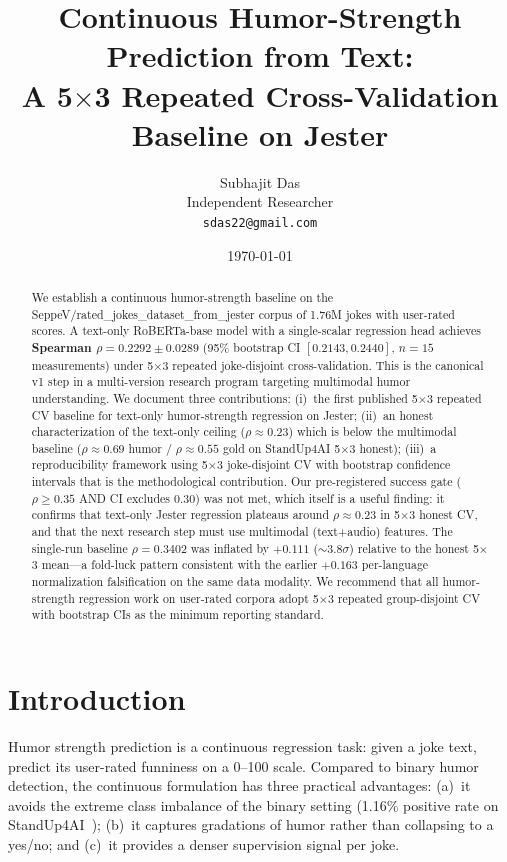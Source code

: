 \documentclass[11pt, letterpaper]{article}
\title{Continuous Humor-Strength Prediction from Text:\\
       A 5$\times$3 Repeated Cross-Validation Baseline on Jester}
\author{Subhajit Das \\
Independent Researcher \\
\texttt{sdas22@gmail.com}}
\date{\today}
\begin{document}
\maketitle

\begin{abstract}
We establish a continuous humor-strength baseline on the SeppeV/rated\_jokes\_dataset\_from\_jester corpus of 1.76M jokes with user-rated scores. A text-only RoBERTa-base model with a single-scalar regression head achieves \textbf{Spearman $\rho = 0.2292 \pm 0.0289$} (95\% bootstrap CI $[0.2143, 0.2440]$, $n=15$ measurements) under 5$\times$3 repeated joke-disjoint cross-validation. This is the canonical v1 step in a multi-version research program targeting multimodal humor understanding. We document three contributions: (i)~the first published 5$\times$3 repeated CV baseline for text-only humor-strength regression on Jester; (ii)~an honest characterization of the text-only ceiling ($\rho \approx 0.23$) which is below the multimodal baseline ($\rho \approx 0.69$ humor / $\rho \approx 0.55$ gold on StandUp4AI 5$\times$3 honest); (iii)~a reproducibility framework using 5$\times$3 joke-disjoint CV with bootstrap confidence intervals that is the methodological contribution. Our pre-registered success gate ($\rho \geq 0.35$ AND CI excludes $0.30$) was not met, which itself is a useful finding: it confirms that text-only Jester regression plateaus around $\rho \approx 0.23$ in 5$\times$3 honest CV, and that the next research step must use multimodal (text+audio) features. The single-run baseline $\rho = 0.3402$ was inflated by $+0.111$ ($\sim$3.8$\sigma$) relative to the honest 5$\times$3 mean---a fold-luck pattern consistent with the earlier $+0.163$ per-language normalization falsification on the same data modality. We recommend that all humor-strength regression work on user-rated corpora adopt 5$\times$3 repeated group-disjoint CV with bootstrap CIs as the minimum reporting standard.
\end{abstract}

\section{Introduction}

Humor strength prediction is a continuous regression task: given a joke text, predict its user-rated funniness on a 0--100 scale. Compared to binary humor detection, the continuous formulation has three practical advantages: (a)~it avoids the extreme class imbalance of the binary setting (1.16\% positive rate on StandUp4AI~\cite{standup4ai}); (b)~it captures gradations of humor rather than collapsing to a yes/no; and (c)~it provides a denser supervision signal per joke.
\end{document}
